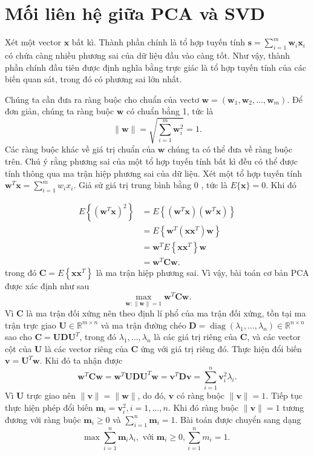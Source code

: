 \documentclass[12pt,a4paper,oneside]{report}
\numberwithin{equation}{section}
\begin{document}
\section{Mối liên hệ giữa PCA và SVD}
Xét một vector $\mathbf{x}$ bất kì. Thành phần chính là tổ hợp tuyến tính $\mathbf{s}=\sum_{i=1}^{m} \mathbf{w}_{i} \mathbf{x}_{i}$ có chứa càng nhiều phương sai của dữ liệu đầu vào càng tốt. Như vậy, thành phần chính đầu tiên được định nghĩa bằng trực giác là tổ hợp tuyến tính của các biến quan sát, trong đó có phương sai lớn nhất.

Chúng ta cần đưa ra ràng buộc cho chuẩn của vectơ $\mathbf{w}=\left(\mathbf{w}_{1}, \mathbf{w}_{2}, \ldots, \mathbf{w}_{m}\right)$. Để đơn giản, chúng ta ràng buộc $\mathbf{w}$ có chuẩn bằng 1, tức là
$$
\|\mathbf{w}\|=\sqrt{\sum_{i=1}^{m} \mathbf{w}_{i}^{2}}=1.
$$
Các ràng buộc khác về giá trị chuẩn của $\mathbf{w}$ chúng ta có thể đưa về ràng buộc trên.
Chú ý rằng phương sai của một tổ hợp tuyến tính bất kì đều có thể được tính thông qua ma trận hiệp phương sai của dữ liệu. Xét một tổ hợp tuyến tính $\mathbf{w}^{T} \mathbf{x}=\sum_{i=1}^{m} w_{i} x_{i}$. Giả sử giá trị trung bình bằng 0 , tức là $E\{\mathbf{x}\}=0$. Khi đó

$$
\begin{aligned}
	E\left\{\left(\mathbf{w}^{T} \mathbf{x}\right)^{2}\right\}&=E\left\{\left(\mathbf{w}^{T} \mathbf{x}\right)\left(\mathbf{w}^{T} \mathbf{x}\right)\right\}\\
	 &=E\left\{\mathbf{w}^{T}\left(\mathbf{x} \mathbf{x}^{T}\right) \mathbf{w}\right\}\\
	 & =\mathbf{w}^{T} E\left\{\mathbf{x} \mathbf{x}^{T}\right\} \mathbf{w}\\
	& =\mathbf{w}^{T} \mathbf{C} \mathbf{w}.
\end{aligned}
$$
trong đó $\mathbf{C}=E\left\{\mathbf{x} \mathbf{x}^{T}\right\}$ là ma trận hiệp phương sai. Vì vậy, bài toán cơ bản $\mathrm{PCA}$ được xác định như sau
$$
\max _{\mathbf{w}:\|\mathbf{w}\|=1} \mathbf{w}^{T}\mathbf{Cw}.
$$
Vì $\mathbf{C}$ là ma trận đối xứng nên theo định lí phổ của ma trận đối xứng, tồn tại ma trận trực giao $\mathbf{U} \in \mathbb{R}^{m \times n}$ và ma trận đường chéo $\mathbf{D}=\operatorname{diag}\left(\lambda_{1}, \ldots, \lambda_{n}\right) \in \mathbb{R}^{n \times n}$ sao cho $\mathbf{C} = \mathbf{U} \mathbf{D} \mathbf{ U}^{T}$, trong đó $\lambda_{1}, \ldots, \lambda_{n}$ là các giá trị riêng của $\mathbf{C}$, và các vector cột của $\mathbf{U}$ là các vector riêng của $\mathbf{C}$ ứng với giá trị riêng đó. Thực hiện đổi biến $\mathbf{v}=\mathbf{U}^{T} \mathbf{w}$. Khi đó ta nhận được
$$
\mathbf{w}^{T} \mathbf{C} \mathbf{w}=\mathbf{w}^{T} \mathbf{U} \mathbf{D} \mathbf{U}^{T} \mathbf{w}=\mathbf{v}^{T} \mathbf{D} \mathbf{v}=\sum_{i=1}^{n} \mathbf{v}_{i}^{2} \lambda_{i}.
$$
Vì $\mathbf{U}$ trực giao nên $\|\mathbf{v}\|=\|\mathbf{w}\|$, do đó, $\mathbf{v}$ có ràng buộc $\|\mathbf{v}\|=1$. Tiếp tục thực hiện phép đổi biến $\mathbf{m}_{i}=\mathbf{v}_{i}^{2}, i=1, \ldots, n$. Khi đó ràng buộc $\|\mathbf{v}\|=1$ tương đương với ràng buộc $\mathbf{m}_{i} \geq 0$ và $\sum_{i=1}^{n} \mathbf{m}_{i}=1$. Bài toán được chuyển sang dạng
$$
\max \sum_{i=1}^{n} \mathbf{m}_{i} \lambda_{i}, \text { với } \mathbf{m}_{i} \geq 0, \sum_{i=1}^{n} m_{i}=1 \text {. }
$$
\end{document}
